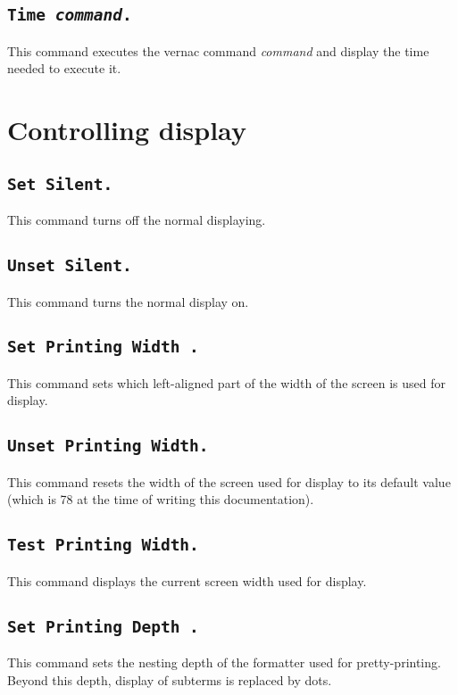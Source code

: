 \subsection[\tt Time \textrm{\textsl{command}}.]{\tt Time \textrm{\textsl{command}}.
\label{time}}
This command executes the vernac command \textrm{\textsl{command}}
and display the time needed to execute it.

\section{Controlling display}

\subsection[\tt Set Silent.]{\tt Set Silent.
\label{Begin-Silent}
}
This command turns off the normal displaying.

\subsection[\tt Unset Silent.]{\tt Unset Silent.}
This command turns the normal display on.

\subsection[\tt Set Printing Width {\integer}.]{\tt Set Printing Width {\integer}.}
This command sets which left-aligned part of the width of the screen
is used for display. 

\subsection[\tt Unset Printing Width.]{\tt Unset Printing Width.}
This command resets the width of the screen used for display to its
default value (which is 78 at the time of writing this documentation).

\subsection[\tt Test Printing Width.]{\tt Test Printing Width.}
This command displays the current screen width used for display.

\subsection[\tt Set Printing Depth {\integer}.]{\tt Set Printing Depth {\integer}.}
This command sets the nesting depth of the formatter used for
pretty-printing. Beyond this depth, display of subterms is replaced by
dots. 

